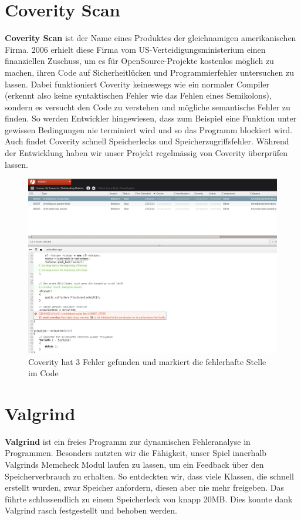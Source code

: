 \documentclass[11pt,a4paper]{scrbook}
\begin{document}
\section{Coverity Scan}
\textbf{Coverity Scan} ist der Name eines Produktes der gleichnamigen amerikanischen Firma. 2006 erhielt diese Firma vom US-Verteidigungsministerium
einen finanziellen Zuschuss, um es für OpenSource-Projekte kostenlos möglich zu machen, ihren Code auf Sicherheitlücken und Programmierfehler untersuchen
zu lassen. Dabei funktioniert Coverity keineswegs wie ein normaler Compiler (erkennt also keine syntaktischen Fehler wie das Fehlen eines Semikolons),
sondern es versucht den Code zu verstehen und mögliche semantische Fehler zu finden. So werden Entwickler hingewiesen, dass zum Beispiel eine Funktion
unter gewissen Bedingungen nie terminiert wird und so das Programm blockiert wird. Auch findet Coverity schnell Speicherlecks und Speicherzugriffsfehler.
Während der Entwicklung haben wir unser Projekt regelmässig von Coverity überprüfen lassen.
\begin{figure}
\centering
\includegraphics[scale=0.4]{img/coverity.png}
\caption{Coverity hat 3 Fehler gefunden und markiert die fehlerhafte Stelle im Code}
\end{figure}

\section{Valgrind}
\textbf{Valgrind} ist ein freies Programm zur dynamischen Fehleranalyse in Programmen. Besonders nutzten wir die Fähigkeit,
unser Spiel innerhalb Valgrinds Memcheck Modul laufen zu lassen, um ein Feedback über den Speicherverbrauch zu erhalten. So entdeckten
wir, dass viele Klassen, die schnell erstellt wurden, zwar Speicher anfordern, diesen aber nie mehr freigeben.
Das führte schlussendlich zu einem Speicherleck von knapp 20MB. Dies konnte dank Valgrind rasch festgestellt und behoben werden.
\end{document}
